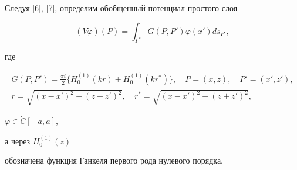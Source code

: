 Следуя [6], [7], определим обобщенный потенциал простого слоя


$$


(V \varphi) (P) = \int_{\Gamma^\ast}


G (P, P') \varphi (x') d s_{P'},


$$


где


\begin{gather*}


G (P,P') = \frac{\pi i}{2} \{


 H_0^{(1)} (k r) + H_0^{(1)} (k r^\ast)\}, \quad


P = (x,z),\quad P' = (x',z'), \\


%


r = \sqrt{(x - x')^2 + (z - z')^2},


\quad


r^\ast = \sqrt{(x - x')^2 + (z + z')^2},


\end{gather*}


$\varphi \in \Dot C[-a,a]$,


а через $H_0^{(1)} (z)$


обозначена функция Ганкеля первого рода нулевого порядка.





